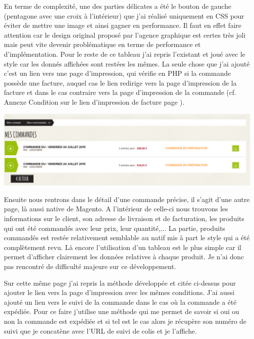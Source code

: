 \documentclass[a4paper,11pt,twoside]{report}
\begin{document}
    	En terme de complexité, une des parties délicates a été le bouton de gauche (pentagone avec une croix à l'intérieur) que j'ai réalisé uniquement en CSS pour éviter de mettre une image et ainsi gagner en performance. Il faut en effet faire attention car le design original proposé par l'agence graphique est certes très joli mais peut vite devenir problématique en terme de performance et d'implémentation. Pour le reste de ce tableau j'ai repris l'existant et joué avec le style car les donnés affichées sont restées les mêmes. La seule chose que j'ai ajouté c'est un lien vers une page d'impression, qui vérifie en PHP si la commande possède une facture, auquel cas le lien redirige vers la page d'impression de la facture et dans le cas contraire vers la page d'impression de la commande (cf. Annexe Condition sur le lien d'impression de facture page \pageref{SL_print_condition}).
	\begin{center}
	  \includegraphics[scale=0.3]{images/SL_command_history.png} 
	  \label{SL_command_history}
	\end{center}
    	Ensuite nous rentrons dans le détail d'une commande précise, il s'agit d'une autre page, là aussi native de Magento. A l'intérieur de celle-ci nous trouvons les informations sur le client, son adresse de livraison et de facturation, les produits qui ont été commandés avec leur prix, leur quantité,... La partie, produits commandés est restée relativement semblable au natif mis à part le style qui a été complètement revu. Là encore l'utilisation d'un tableau est le plus simple car il permet d'afficher clairement les données relatives à chaque produit. Je n'ai donc pas rencontré de difficulté majeure sur ce développement.
    
    	Sur cette même page j'ai repris la méthode développée et citée ci-dessus pour ajouter le lien vers la page d'impression avec les mêmes conditions. J'ai aussi ajouté un lien vers le suivi de la commande dans le cas où la commande a été expédiée. Pour ce faire j'utilise une méthode qui me permet de savoir si oui ou non la commande est expédiée et si tel est le cas alors je récupère son numéro de suivi que je concatène avec l'URL de suivi de colis et je l'affiche.
    
\end{document}
